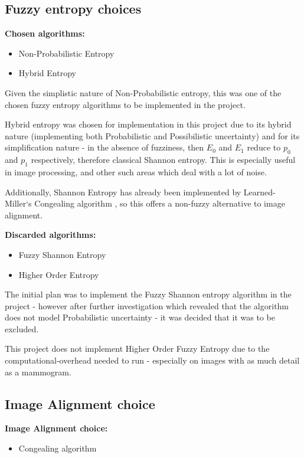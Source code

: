 \subsection{Fuzzy entropy choices}

\textbf{Chosen algorithms:}
\begin{itemize}
  \item Non-Probabilistic Entropy
  \item Hybrid Entropy
\end{itemize}

Given the simplistic nature of Non-Probabilistic entropy, this was one of the chosen fuzzy entropy algorithms to be implemented in the project.

Hybrid entropy was chosen for implementation in this project due to its hybrid nature (implementing both Probabilistic and Possibilistic uncertainty) and for its simplification nature - in the absence of fuzziness, then $E_0$ and $E_1$ reduce to $p_0$ and $p_1$ respectively, therefore classical Shannon entropy. This is especially useful in image processing, and other such areas which deal with a lot of noise.

Additionally, Shannon Entropy has already been implemented by Learned-Miller`s Congealing algorithm \cite{joint-alignment}, so this offers a non-fuzzy alternative to image alignment.

\textbf{Discarded algorithms:}
\begin{itemize}
  \item Fuzzy Shannon Entropy
  \item Higher Order Entropy
\end{itemize}

The initial plan was to implement the Fuzzy Shannon entropy algorithm in the project - however after further investigation which revealed that the algorithm does not model Probabilistic uncertainty - it was decided that it was to be excluded.

This project does not implement Higher Order Fuzzy Entropy due to the computational-overhead needed to run - especially on images with as much detail as a mammogram.


\subsection{Image Alignment choice}

\textbf{Image Alignment choice:}
\begin{itemize}
    \item \Gls{Congealing} algorithm
\end{itemize}


